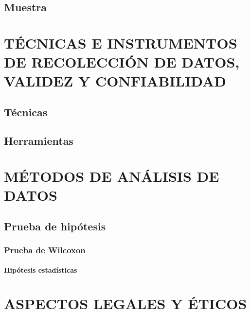 \lipsum[3]

\subsection{Muestra}

\lipsum[4]

\section{TÉCNICAS E INSTRUMENTOS DE RECOLECCIÓN DE DATOS, VALIDEZ Y CONFIABILIDAD}

\subsection{Técnicas}

\lipsum[5]

\subsection{Herramientas}

\lipsum[6]

\section{MÉTODOS DE ANÁLISIS DE DATOS}

\lipsum[7]

\subsection{Prueba de hipótesis}

\lipsum[8]

\subsubsection{Prueba de Wilcoxon}

\lipsum[9]

\paragraph{Hipótesis estadísticas}

\lipsum[10]

\section{ASPECTOS LEGALES Y ÉTICOS}

\lipsum[11]
